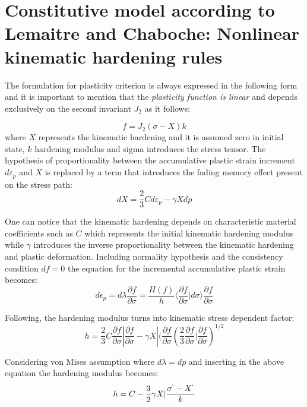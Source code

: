\documentclass[11pt,a4paper]{report}
\begin{document}
\section{Constitutive model according to Lemaitre and Chaboche: Nonlinear kinematic hardening rules }

The formulation for plasticity criterion is always expressed in the following form and it is important to mention that the\textit{ plasticity function is linear} and depends exclusively on the second invariant $J_2$ as it follows:

\begin{equation}
	f=J_2(\sigma-X)k
\end{equation}
where $X$ represents the kinematic hardening and it is assumed zero in initial state, $k$ hardening modulus and sigma introduces the stress tensor. The hypothesis of proportionality between the accumulative plastic strain increment $d\varepsilon_p$ and $X$ is replaced by a term that introduces the fading memory effect present on the stress path:
\begin{equation}
	dX=\frac{2}{3}Cd\varepsilon_p - \gamma Xdp
\end{equation}

One can notice that the kinematic hardening depends on characteristic material coefficients such as $C$ which represents the initial kinematic hardening modulus while $\gamma$ introduces the inverse proportionality between the kinematic hardening and plastic deformation. Including normality hypothesis and the consistency condition $df=0$ the equation for the incremental accumulative plastic strain becomes:
\begin{equation}
	d\epsilon_p=d\lambda\frac{\partial f}{\partial \sigma}=\frac{H(f)}{h}\langle\frac{\partial f}{\partial \sigma}|d\sigma \rangle \frac{\partial f}{\partial\sigma}
\end{equation}

Following, the hardening modulus turns into kinematic stress dependent factor:
\begin{equation}
	h=\frac{2}{3}C \frac{\partial f}{\partial\sigma}|\frac{\partial f}{\partial\sigma} - \gamma X | (\frac{\partial f}{\partial\sigma}(\frac{2}{3}\frac{\partial f}{\partial\sigma}|\frac{\partial f}{\partial\sigma})^{1/2}
\end{equation}

Considering von Mises assumption where $d\lambda =dp$ and inserting in the above equation the hardening modulus becomes:
\begin{equation}
h=C-\frac{3}{2}\gamma X|\frac{\sigma^` - X^`}{k}
\end{equation}
\end{document}
